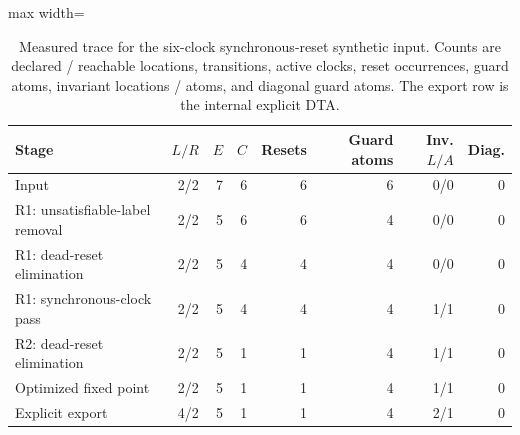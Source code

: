 \begin{table}[t]
\centering
\caption{Measured trace for the six-clock synchronous-reset synthetic input. Counts are declared / reachable locations, transitions, active clocks, reset occurrences, guard atoms, invariant locations / atoms, and diagonal guard atoms. The export row is the internal explicit DTA.}
\label{tab:synchronous-trace}
\scriptsize
\setlength{\tabcolsep}{3pt}
\begin{adjustbox}{max width=\textwidth}\begin{tabular}{@{}p{}rrrrrrr@{}}
\toprule
Stage & $L/R$ & $E$ & $C$ & Resets & Guard atoms & Inv. $L/A$ & Diag.\\
\midrule
Input & 2/2 & 7 & 6 & 6 & 6 & 0/0 & 0 \\
R1: unsatisfiable-label removal & 2/2 & 5 & 6 & 6 & 4 & 0/0 & 0 \\
R1: dead-reset elimination & 2/2 & 5 & 4 & 4 & 4 & 0/0 & 0 \\
R1: synchronous-clock pass & 2/2 & 5 & 4 & 4 & 4 & 1/1 & 0 \\
R2: dead-reset elimination & 2/2 & 5 & 1 & 1 & 4 & 1/1 & 0 \\
Optimized fixed point & 2/2 & 5 & 1 & 1 & 4 & 1/1 & 0 \\
Explicit export & 4/2 & 5 & 1 & 1 & 4 & 2/1 & 0 \\
\bottomrule
\end{tabular}\end{adjustbox}
\end{table}
